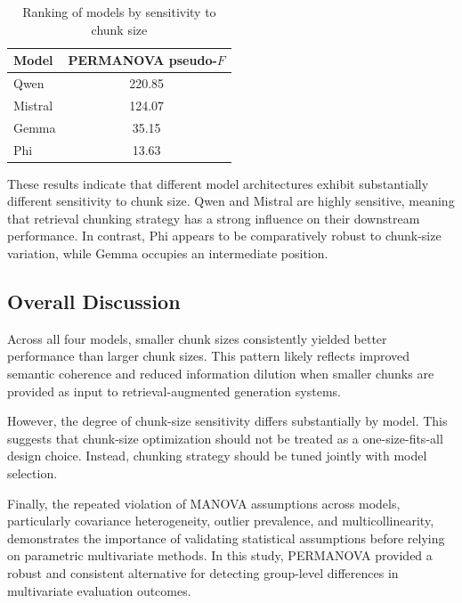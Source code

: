\documentclass[11pt]{article}
\begin{document}
\begin{table}[H]
\centering
\caption{Ranking of models by sensitivity to chunk size}
\label{tab:model_ranking}
\begin{tabular}{lc}
\toprule
Model & PERMANOVA pseudo-$F$ \\
\midrule
Qwen    & 220.85 \\
Mistral & 124.07 \\
Gemma   & 35.15 \\
Phi     & 13.63 \\
\bottomrule
\end{tabular}
\end{table}

These results indicate that different model architectures exhibit substantially different sensitivity to chunk size. Qwen and Mistral are highly sensitive, meaning that retrieval chunking strategy has a strong influence on their downstream performance. In contrast, Phi appears to be comparatively robust to chunk-size variation, while Gemma occupies an intermediate position.

\subsection{Overall Discussion}

Across all four models, smaller chunk sizes consistently yielded better performance than larger chunk sizes. This pattern likely reflects improved semantic coherence and reduced information dilution when smaller chunks are provided as input to retrieval-augmented generation systems.

However, the degree of chunk-size sensitivity differs substantially by model. This suggests that chunk-size optimization should not be treated as a one-size-fits-all design choice. Instead, chunking strategy should be tuned jointly with model selection.

Finally, the repeated violation of MANOVA assumptions across models, particularly covariance heterogeneity, outlier prevalence, and multicollinearity, demonstrates the importance of validating statistical assumptions before relying on parametric multivariate methods. In this study, PERMANOVA provided a robust and consistent alternative for detecting group-level differences in multivariate evaluation outcomes.
\end{document}
